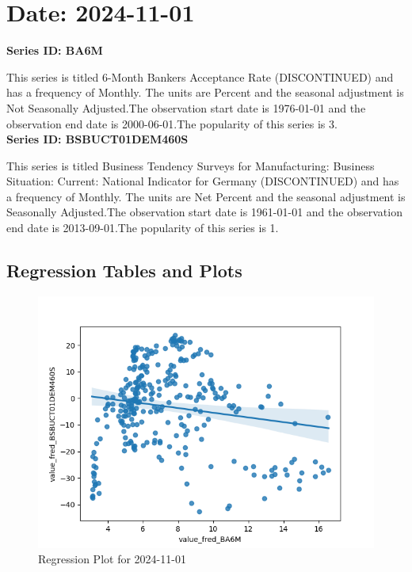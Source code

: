 \section{Date: 2024-11-01}
\noindent \textbf{Series ID: BA6M} 

\noindent This series is titled 6-Month Bankers Acceptance Rate (DISCONTINUED) and has a frequency of Monthly. The units are Percent and the seasonal adjustment is Not Seasonally Adjusted.The observation start date is 1976-01-01 and the observation end date is 2000-06-01.The popularity of this series is 3. \\ 

\noindent \textbf{Series ID: BSBUCT01DEM460S} 

\noindent This series is titled Business Tendency Surveys for Manufacturing: Business Situation: Current: National Indicator for Germany (DISCONTINUED) and has a frequency of Monthly. The units are Net Percent and the seasonal adjustment is Seasonally Adjusted.The observation start date is 1961-01-01 and the observation end date is 2013-09-01.The popularity of this series is 1. \\ 

\subsection{Regression Tables and Plots}


\begin{figure}
\centering
\includegraphics[scale = 0.9]{plots/plot_2024-11-01.png}
\caption{Regression Plot for 2024-11-01}
\end{figure}
\newpage
